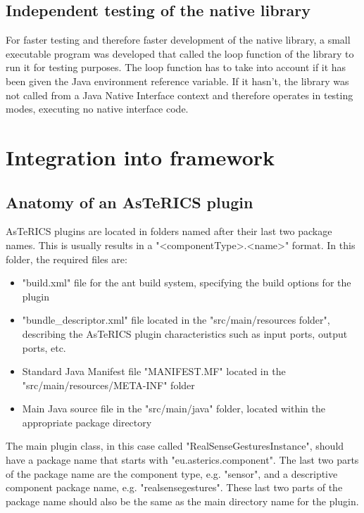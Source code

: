 \documentclass[BSA,Bachelor,english]{twbook}%
\begin{document}
\subsection{Independent testing of the native library}

For faster testing and therefore faster development of the native library, a small executable program was developed that called the loop function of the library to run it for testing purposes. The loop function has to take into account if it has been given the Java environment reference variable. If it hasn't, the library was not called from a Java Native Interface context and therefore operates in testing modes, executing no native interface code.

\section{Integration into framework}

\subsection{Anatomy of an AsTeRICS plugin}

AsTeRICS plugins are located in folders named after their last two package names. This is usually results in a "<componentType>.<name>" format. In this folder, the required files are:

\begin{itemize}
	\item "build.xml" file for the ant build system, specifying the build options for the plugin
	\item "bundle\_descriptor.xml" file located in the "src/main/resources folder", describing the AsTeRICS plugin characteristics such as input ports, output ports, etc.
	\item Standard Java Manifest file "MANIFEST.MF" located in the "src/main/resources/META-INF" folder
	\item Main Java source file in the "src/main/java" folder, located within the appropriate package directory
\end{itemize}

The main plugin class, in this case called "RealSenseGesturesInstance", should have a package name that starts with "eu.asterics.component". The last two parts of the package name are the component type, e.g. "sensor", and a descriptive component package name, e.g. "realsensegestures". These last two parts of the package name should also be the same as the main directory name for the plugin.
\end{document}
